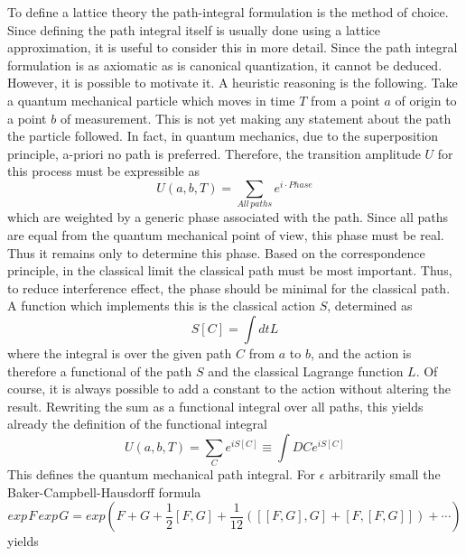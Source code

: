 \documentclass[preprint,12pt]{elsarticle}
\begin{document}
To define a lattice theory the path-integral formulation is the method of choice. Since
defining the path integral itself is usually done using a lattice approximation, it is useful
to consider this in more detail. Since the path integral formulation is as axiomatic as is canonical quantization, it cannot be deduced. However, it is possible to motivate it. A heuristic reasoning is the following. Take a quantum mechanical particle which moves in time $T$ from a point $a$ of origin to a point $b$ of measurement. This is not yet making any statement about the path the particle followed. In fact, in quantum mechanics, due to the superposition principle, a-priori no path is preferred. Therefore, the transition amplitude $U$ for this process must be expressible as
\begin{equation}
U(a, b, T) = \sum_{All\hspace{2pt}paths}e^{i\cdot Phase}
\end{equation}
which are weighted by a generic phase associated with the path. Since all paths are equal from the quantum mechanical point of view, this phase must be real. Thus it remains only to determine this phase. Based on the correspondence principle, in the classical limit the classical path must be most important. Thus, to reduce interference effect, the phase should be minimal for the classical path. A function which implements this is the classical action $S$, determined as
\begin{equation}
S[C] = \int dtL
\end{equation}
where the integral is over the given path $C$ from $a$ to $b$, and the action is therefore a functional of the path $S$ and the classical Lagrange function $L$. Of course, it is always possible to add a constant to the action without altering the result. Rewriting the sum as a functional integral over all paths, this yields already the definition of the functional integral
\begin{equation}
U(a, b, T) = \sum_{C}e^{iS[C]} \equiv \int DCe^{iS[C]}
\end{equation}
This defines the quantum mechanical path integral. For $\epsilon$ arbitrarily small the Baker-Campbell-Hausdorff formula
\begin{equation}
exp\hspace{1pt}F\hspace{2pt}exp\hspace{1pt}G = exp(F + G + \frac{1}{2}[F, G] + \frac{1}{12}([[F, G], G] + [F, [F, G]]) + \cdots)
\end{equation}
yields
\end{document}
